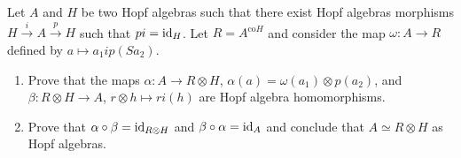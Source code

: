 \documentclass[12pt]{amsproc}
\begin{document}
\begin{exercise}
Let $A$ and $H$ be two Hopf algebras such that there exist Hopf algebras
morphisms $H\xrightarrow{i}A\xrightarrow{p}H$ such that $pi=\operatorname{id}_H$. Let
$R=A^{\mathrm{co}H}$ and consider the map $\omega:A\to R$ defined by $a\mapsto
a_1ip(Sa_2)$. 
\begin{enumerate}
    \item Prove that the maps $\alpha:A\to R\otimes H$, $\alpha(a)=\omega(a_1)\otimes p(a_2)$, and 
    $\beta:R\otimes H\to A$, $r\otimes h\mapsto ri(h)$     
    are Hopf algebra homomorphisms. 
    \item Prove that $\alpha\circ\beta=\operatorname{id}_{R\otimes H}$ and $\beta\circ\alpha=\operatorname{id}_A$ and 
    conclude that $A\simeq R\otimes H$ as Hopf algebras.
\end{enumerate}
\end{exercise}


\newpage 




\printindex
\end{document}
